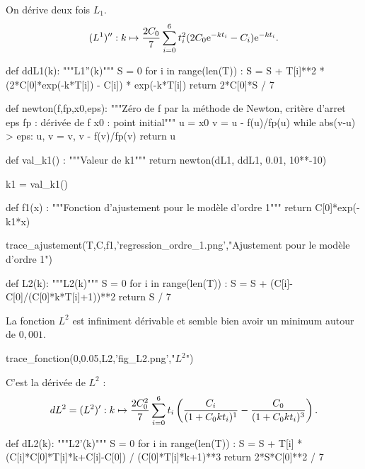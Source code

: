 \question{}
On dérive deux fois $L_1$.
\begin{equation*}
  (L^1)'' : k \mapsto \dfrac{2C_0}{7}\sum_{i=0}^6 t_i^2 (2C_0\mathrm{e}^{-kt_i}-C_i)\mathrm{e}^{-kt_i}.
\end{equation*}

\begin{pyverbatim}
def ddL1(k):
    """L1''(k)"""
    S = 0
    for i in range(len(T)) :
        S = S + T[i]**2 * (2*C[0]*exp(-k*T[i]) - C[i]) * exp(-k*T[i])
    return 2*C[0]*S / 7
\end{pyverbatim}

\question{}
\begin{pyverbatim}
def newton(f,fp,x0,eps):
    """Zéro de f par la méthode de Newton, critère d'arret eps
    fp : dérivée de f
    x0 : point initial"""
    u = x0
    v = u - f(u)/fp(u)
    while abs(v-u) > eps:
        u, v = v, v - f(v)/fp(v)
    return u
\end{pyverbatim}

\question{}
\begin{pyverbatim}
def val_k1() :
    """Valeur de k1"""
    return newton(dL1, ddL1, 0.01, 10**-10)

k1 = val_k1()
  
\end{pyverbatim}

\question{}
\begin{pyverbatim}
def f1(x) :
    """Fonction d'ajustement pour le modèle d'ordre 1"""
    return  C[0]*exp(-k1*x)

trace_ajustement(T,C,f1,'regression_ordre_1.png',"Ajustement pour le modèle d'ordre 1")
\end{pyverbatim}

\question{}
\begin{pyverbatim}
def L2(k):
    """L2(k)"""
    S = 0
    for i in range(len(T)) :
        S = S + (C[i]-C[0]/(C[0]*k*T[i]+1))**2
    return S / 7   
\end{pyverbatim}

\question{}
La fonction $L^2$ est infiniment dérivable et semble bien avoir un minimum autour de $0,001$.
\begin{pyverbatim}
trace_fonction(0,0.05,L2,'fig_L2.png',"$L^2$")
\end{pyverbatim}

\question{}
C'est la dérivée de $L^2$ : 
\begin{equation*}
  dL^2 = (L^2)' : k \mapsto \dfrac{2C_0^2}{7} \sum_{i=0}^6 t_i \left(  \dfrac{C_i}{(1+C_0kt_i)^1} -\dfrac{C_0}{(1+C_0kt_i)^3}\right).
\end{equation*}
\begin{pyverbatim}
def dL2(k):
    """L2'(k)"""
    S = 0
    for i in range(len(T)) :
        S = S + T[i] * (C[i]*C[0]*T[i]*k+C[i]-C[0]) / (C[0]*T[i]*k+1)**3
    return  2*S*C[0]**2 / 7 
\end{pyverbatim}


